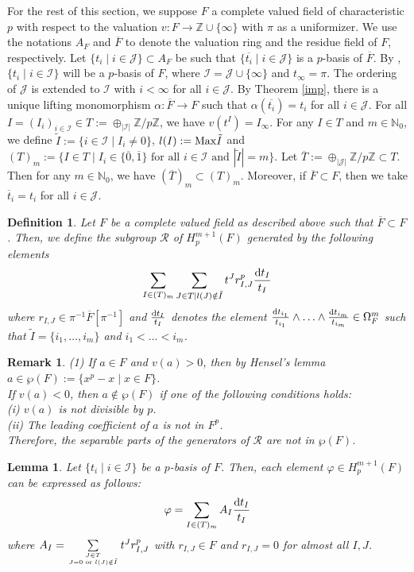 \documentclass[times,10pt]{amsart}
\newcommand{\N}{\ensuremath{\mathbb{N}}}
\newcommand{\Z}{\ensuremath{\mathbb{Z}}}
\newcommand{\dd}{{\rm d}}
\newcommand{\I}{\ensuremath{\mathcal{I}}}
\newcommand{\R}{\ensuremath{\mathcal{R}}}
\newcommand{\n}{\ensuremath{\infty}}
\renewcommand{\phi}{\varphi}
\newtheorem{defn}[thm]{Definition}%
\newtheorem{lemma}[thm]{Lemma}%
\newtheorem{rem}[thm]{Remark}%
\begin{document}
    For the {rest} of this section, we suppose   $ F$ a complete  valued field  of characteristic $p$ with respect to the valuation $ v: F\xrightarrow{} \Z\cup\{\n\}$ with $\pi$ as a uniformizer.  We use the notations $A_F$ and $\overline{F}$ to denote the valuation ring and the residue field of $F$, respectively. Let $ \{ t_i\mid i\in \mathcal{J}\} \subset A_F$ be such that $ \{ \overline{t_i}\mid i\in \mathcal{J}\}$ {is a } $p$-basis of $\overline{F}$. {By \cite[Remark 1.1.1.12.]{LX},} $\{ t_i\mid i\in \I\}$ will be a $p$-basis of $F$, where $ \I=\mathcal{J}\cup \{\infty\}$ and $t_{\infty}=\pi $.   The ordering of $\mathcal{J}$ is extended to $\I$ with $ i<\infty$ for all $i\in \mathcal{J}$.
     By Theorem \ref{imp}, there is a unique lifting monomorphism $\alpha: \overline{F}\xrightarrow{} F$ such that $\alpha( \overline{t_i})= t_i$ for all $i\in \mathcal{J}$.
    For all ${I= ( I_i)_{i\in \I}}\in T:= \oplus_{|\I|} \Z/p\Z$, we have  $v( t^I)= I_{\infty}$. For any $I\in T$ and $m\in \N_0$, we define $ \tilde{I}:=\{ i\in \I\mid I_i\neq 0\}$, $l(I):= {\rm Max} \tilde{I}$   and $(T)_m:=\{ I\in T\mid  I_i\in \{\overline{0},\overline{1}\}\text{  for all $i\in \I$ and } |\tilde{I}|=m\}$. Let $\overline{T}:= \oplus_{|\mathcal{J}|} \Z/p\Z\subset T$. Then for any $m\in \N_0$, we have \label{p1}$(\overline{T})_m\subset (T)_m$.  {Moreover, if} $\overline{F}\subset F$, then we take $ \overline{t}_i=t_i$ for all $i\in \mathcal{J}$.
    
    \begin{defn}\label{dr} Let $F$ be a complete valued field as described above such that $\overline{F}\subset F$.
        Then, we define the subgroup  $\R$  of $H_p^{m+1}(F)$ generated by the following elements $$   \sum_{I\in (T)_m}\sum_{J\in T\mid l(J)\notin \tilde{I}} t^J r^p_{I,J} \frac{\dd t_I}{t_I}$$   where $r_{I,J}\in \pi^{-1}\overline{F}[\pi^{-1}]$   and  $\frac{\dd t_I}{t_I}$ denotes the element $ \frac{\dd t_{i_1}}{t_{i_1}}\wedge \ldots\wedge \frac{\dd t_{i_m}}{t_{i_m}}\in \Omega_F^m$ such that $\tilde{I}= \{ i_1,\ldots,i_m\}$  and $i_1<\ldots<i_m$.  
    \end{defn}

    \begin{rem}\label{rv}(1) If $a\in F$ and $v(a)>0$, then by Hensel's lemma  $a\in \wp(F):= \{ x^p-x\mid x\in F\}$.\\
 If $v(a)<0$, then $a\notin \wp(F)$ if one of  the following  conditions {holds}:\\(i) $ v(a)$ is not divisible by $p$.\\(ii) The leading coefficient of $a$ is not {in $F^p$}.\\ 
Therefore, the separable parts of the generators of   $\R$ are not   in $\wp(F)$.
\end{rem}
\begin{lemma}\label{lde}
    Let $\{ t_i\mid i\in \I\}$ be a $p$-basis of $F$. Then, each element $\phi\in H_p^{m+1}(F)$ can be expressed as follows:$$\phi= \sum_{I\in (T)_m} A_I \frac{\dd t_I}{t_I}$$ where $ A_I= \sum\limits_{J\in T\atop J=0 \text{ or } l(J)\notin \tilde{I}} t^J r^p_{I,J}$ with  $r_{I,J}\in F$ and $r_{I,J}=0$ for {almost} all $I,J$.
\end{lemma}
    
\end{document}

